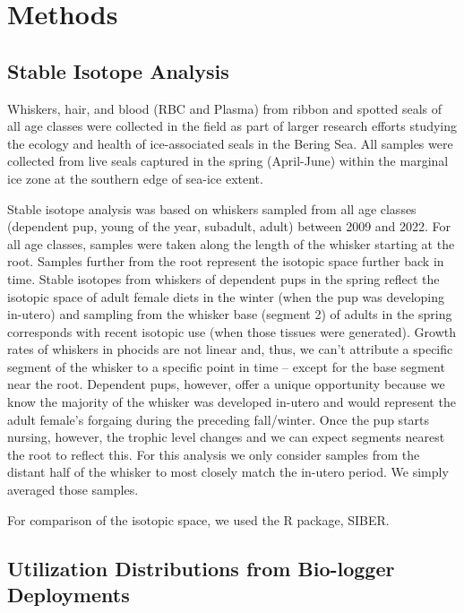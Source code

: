 \documentclass[
  authoryear,
  preprint,
  3p,
  onecolumn]{elsarticle}
\begin{document}
\section{Methods}\label{methods}

\subsection{Stable Isotope Analysis}\label{stable-isotope-analysis}

Whiskers, hair, and blood (RBC and Plasma) from ribbon and spotted seals
of all age classes were collected in the field as part of larger
research efforts studying the ecology and health of ice-associated seals
in the Bering Sea. All samples were collected from live seals captured
in the spring (April-June) within the marginal ice zone at the southern
edge of sea-ice extent.

Stable isotope analysis was based on whiskers sampled from all age
classes (dependent pup, young of the year, subadult, adult) between 2009
and 2022. For all age classes, samples were taken along the length of
the whisker starting at the root. Samples further from the root
represent the isotopic space further back in time. Stable isotopes from
whiskers of dependent pups in the spring reflect the isotopic space of
adult female diets in the winter (when the pup was developing in-utero)
and sampling from the whisker base (segment 2) of adults in the spring
corresponds with recent isotopic use (when those tissues were
generated). Growth rates of whiskers in phocids are not linear and,
thus, we can't attribute a specific segment of the whisker to a specific
point in time -- except for the base segment near the root. Dependent
pups, however, offer a unique opportunity because we know the majority
of the whisker was developed in-utero and would represent the adult
female's forgaing during the preceding fall/winter. Once the pup starts
nursing, however, the trophic level changes and we can expect segments
nearest the root to reflect this. For this analysis we only consider
samples from the distant half of the whisker to most closely match the
in-utero period. We simply averaged those samples.

For comparison of the isotopic space, we used the R package, SIBER.

\subsection{Utilization Distributions from Bio-logger
Deployments}\label{utilization-distributions-from-bio-logger-deployments}
\end{document}

